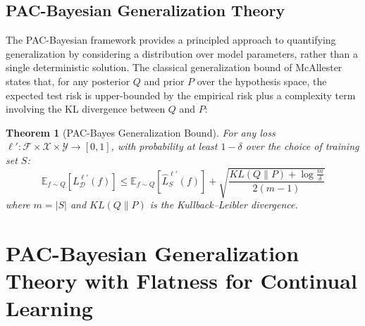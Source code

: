 \documentclass[letterpaper]{article} %
\newtheorem{theorem}{Theorem}
\begin{document}
\subsection{PAC-Bayesian Generalization Theory}

The PAC-Bayesian framework provides a principled approach to quantifying generalization by considering a distribution over model parameters, rather than a single deterministic solution. The classical generalization bound of McAllester~\citep{mcallesterPACBayesianStochasticModel2003} states that, for any posterior $Q$ and prior $P$ over the hypothesis space, the expected test risk is upper-bounded by the empirical risk plus a complexity term involving the KL divergence between $Q$ and $P$:


\begin{theorem}[PAC-Bayes Generalization Bound]
For any loss $\ell': \mathcal{F} \times \mathcal{X} \times \mathcal{Y} \to [0,1]$, with probability at least $1-\delta$ over the choice of training set $S$:
\begin{equation}
    \mathbb{E}_{f \sim Q}[L_{\mathcal{D}}^{\ell'}(f)] \leq \mathbb{E}_{f \sim Q}[\hat{L}_S^{\ell'}(f)] + \sqrt{\frac{KL(Q\|P) + \log \frac{m}{\delta}}{2(m-1)}}
\end{equation}
where $m = |S|$ and $KL(Q\|P)$ is the Kullback–Leibler divergence.
\end{theorem}



\section{PAC-Bayesian Generalization Theory with Flatness for Continual Learning}
\end{document}
